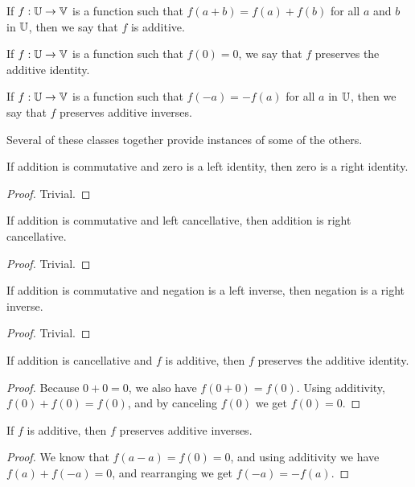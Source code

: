 \documentclass[../../math.tex]{subfiles}
\begin{document}
\begin{class}
    If $f : \mathbb{U} \to \mathbb{V}$ is a function such that $f(a + b) = f(a) + f(b)$ for all
    $a$ and $b$ in $\mathbb{U}$, then we say that $f$ is additive.
\end{class}

\begin{class}
    If $f : \mathbb{U} \to \mathbb{V}$ is a function such that $f(0) = 0$, we say that $f$
    preserves the additive identity.
\end{class}

\begin{class}
    If $f : \mathbb{U} \to \mathbb{V}$ is a function such that $f(-a) = -f(a)$ for all $a$ in
    $\mathbb{U}$, then we say that $f$ preserves additive inverses.
\end{class}

Several of these classes together provide instances of some of the others.

\begin{instance}
    If addition is commutative and zero is a left identity, then zero is a right
    identity.
\end{instance}
\begin{proof}
    Trivial.
\end{proof}

\begin{instance}
    If addition is commutative and left cancellative, then addition is right
    cancellative.
\end{instance}
\begin{proof}
    Trivial.
\end{proof}

\begin{instance}
    If addition is commutative and negation is a left inverse, then negation is
    a right inverse.
\end{instance}
\begin{proof}
    Trivial.
\end{proof}

\begin{instance}
    If addition is cancellative and $f$ is additive, then $f$ preserves the
    additive identity.
\end{instance}
\begin{proof}
    Because $0 + 0 = 0$, we also have $f(0 + 0) = f(0)$.  Using additivity,
    $f(0) + f(0) = f(0)$, and by canceling $f(0)$ we get $f(0) = 0$.
\end{proof}

\begin{instance}
    If $f$ is additive, then $f$ preserves additive inverses.
\end{instance}
\begin{proof}
    We know that $f(a - a) = f(0) = 0$, and using additivity we have $f(a) +
    f(-a) = 0$, and rearranging we get $f(-a) = -f(a)$.
\end{proof}
\end{document}
